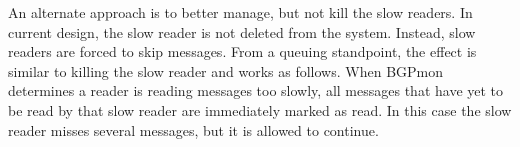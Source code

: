 An alternate approach is to better manage, but not kill the slow readers.   In current design, the slow reader is not deleted from the system.   Instead, slow readers are forced to skip messages.     From a queuing standpoint, the effect is similar to killing the slow reader and works as follows.   When BGPmon determines a reader is reading messages too slowly,  all messages that have yet to be read by that slow reader are immediately marked as read.    In this case the slow reader misses several messages, but it is allowed to continue. 



